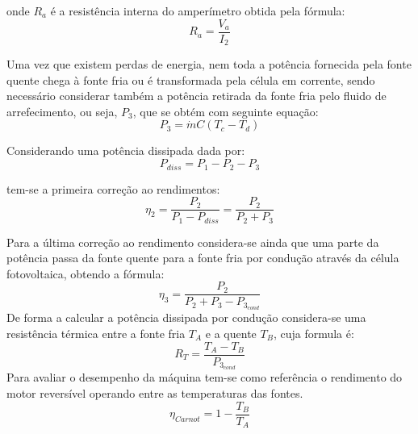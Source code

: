 \documentclass[9pt]{extarticle}
\begin{document}
\begin{multicols}{2}
onde $R_a$ é a resistência interna do amperímetro obtida pela fórmula:
\begin{equation}
R_a = \frac{V_a}{I_2} 
\end{equation}

\par Uma vez que existem perdas de energia, nem toda a potência fornecida pela fonte quente chega à fonte fria ou é transformada pela célula em corrente, sendo necessário considerar também a potência retirada da fonte fria pelo fluido de arrefecimento, ou seja, $ P_3$, que se obtém com seguinte equação:
\begin{equation} \label{P3}
P_3 = \dot{m} C (T_c-T_d)
\end{equation}

\begin{center}
\par{}
\end{center}

\par Considerando uma potência dissipada dada por:
\begin{equation} \label{Pdiss}
P_{diss}=P_1-P_2-P_3
\end{equation}

\par\noindent tem-se a primeira correção ao rendimentos:
\begin{equation} \label{n2}
\eta_2=\frac{P_2}{P_1-P_{diss}}=\frac{P_2}{P_2+P_3}
\end{equation}

\par Para a última correção ao rendimento considera-se ainda que uma parte da potência passa da fonte quente para a fonte fria por condução através da célula fotovoltaica, obtendo a fórmula:
\begin{equation} \label{n3}
\eta_3=\frac{P_2}{P_2+P_3-P_{3_{cond}}}
\end{equation}
De forma a calcular a potência dissipada por condução considera-se uma resistência térmica entre a fonte fria $T_A$ e a quente $T_B$, cuja formula é:
\begin{equation} \label{Rt}
R_T = \frac{T_A - T_B}{P_{3_{cond}}}
\end{equation}
Para avaliar o desempenho da máquina tem-se como referência o rendimento do motor reversível operando entre as temperaturas das fontes.
\begin{equation} \label{Nc}
\eta_{Carnot} = 1 - \frac{T_B}{T_A}
\end{equation}


\end{multicols}
\end{document}
